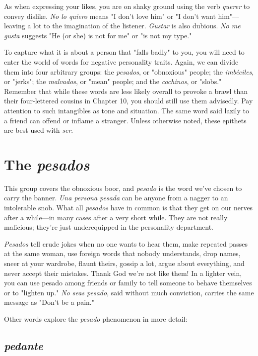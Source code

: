 \documentclass[14pt,a4paper,oneside]{memoir}
\begin{document}
As when expressing your likes, you are on shaky ground using
the verb \emph{querer} to convey dislike. \emph{No lo quiero} means "I don't love
him" or "I don't want him"---leaving a lot to the imagination of the
listener. \emph{Gustar} is also dubious. \emph{No me gusta} suggests "He (or she) is
not for me" or "is not my type."

To capture what it is about a person that "falls badly" to you,
you will need to enter the world of words for negative personality
traits. Again, we can divide them into four arbitrary groups: the \emph{pesados}, or "obnoxious" people; the \emph{imbéciles}, or "jerks"; the \emph{malvados},
or "mean" people; and the \emph{cochinos}, or "slobs." Remember that while
these words are less likely overall to provoke a brawl than their
four-lettered cousins in Chapter 10, you should still use them advisedly.
Pay attention to such intangibles as tone and situation. The same word
said lazily to a friend can offend or inflame a stranger. Unless otherwise noted, these epithets are best used with \emph{ser}.

\section{The \emph{pesados}}

This group covers the obnoxious boor, and \emph{pesado} is the word
we've chosen to carry the banner. \emph{Una persona pesada} can be anyone
from a nagger to an intolerable snob. What all \emph{pesados} have in common is that they get on our nerves after a while---in many cases after
a very short while. They are not really malicious; they're just underequipped in the personality department.

\emph{Pesados} tell crude jokes when no one wants to hear them,
make repeated passes at the same woman, use foreign words that nobody understands, drop names, sneer at your wardrobe, flaunt theirs,
gossip a lot, argue about everything, and never accept their mistakes.
Thank God we're not like them! In a lighter vein, you can use pesado
among friends or family to tell someone to behave themselves or to
"lighten up." \emph{No seas pesado}, said without much conviction, carries
the same message as "Don't be a pain."

Other words explore the \emph{pesado} phenomenon in more detail:

\subsection{\emph{pedante}}
\end{document}
